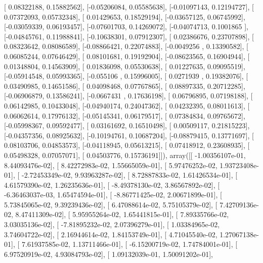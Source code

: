 \documentclass{article}
\begin{document}
       [ 0.08322188,  0.15882562],
       [-0.05206084,  0.05585638],
       [-0.01097143,  0.12194727],
       [ 0.07372093,  0.05732348],
       [ 0.01429653,  0.18529194],
       [-0.03657125,  0.06745992],
       [-0.03059339,  0.06193457],
       [-0.07601703,  0.14269072],
       [-0.04074713,  0.1001865 ],
       [-0.04845761,  0.11988841],
       [-0.10638301,  0.07912307],
       [ 0.02386676,  0.23707898],
       [ 0.08323642,  0.08086589],
       [-0.08866421,  0.22074883],
       [-0.0049256 ,  0.13390582],
       [ 0.06085244,  0.07646429],
       [ 0.08101681,  0.19192904],
       [-0.08623565,  0.16904944],
       [ 0.01348804,  0.14563909],
       [ 0.01836098,  0.05530638],
       [ 0.01227635,  0.09095519],
       [-0.05914548,  0.05993365],
       [-0.055106  ,  0.15996005],
       [ 0.0271939 ,  0.19382076],
       [ 0.03490985,  0.14651586],
       [ 0.04098468,  0.07767865],
       [ 0.08897335,  0.20712285],
       [-0.06906879,  0.13586241],
       [-0.0667431 ,  0.17636198],
       [ 0.06796895,  0.07198188],
       [ 0.06142985,  0.10433048],
       [-0.04940174,  0.24047362],
       [ 0.04232395,  0.08011613],
       [ 0.06062614,  0.17976132],
       [-0.05145341,  0.06179517],
       [ 0.07384834,  0.09765672],
       [-0.05998367,  0.09592477],
       [ 0.03161692,  0.16510498],
       [ 0.00509117,  0.21815223],
       [-0.04357356,  0.08925632],
       [-0.10194761,  0.10687204],
       [-0.08879415,  0.13771697],
       [ 0.08103706,  0.04853573],
       [-0.04118945,  0.05613215],
       [ 0.07418912,  0.23608935],
       [ 0.05498328,  0.07057071],
       [ 0.04503776,  0.15736191]]), array([[ -1.00356107e-01,   8.44093476e-02],
       [  8.42272983e-02,   1.55665059e-01],
       [  5.97476252e-02,   1.93723408e-01],
       [ -2.72453349e-02,   9.93963287e-02],
       [  8.72887833e-02,   1.61426534e-01],
       [  4.61579390e-02,   1.26235636e-01],
       [ -8.49378130e-02,   3.86567892e-02],
       [ -6.36463037e-03,   1.65474594e-01],
       [ -8.86771425e-02,   2.00671899e-01],
       [  5.73845065e-02,   9.39239436e-02],
       [  6.47088614e-02,   5.75105379e-02],
       [  7.42709136e-02,   8.47411309e-02],
       [  5.95955264e-02,   1.65441815e-01],
       [  7.89335766e-02,   3.03035136e-02],
       [ -7.81895232e-02,   2.07396279e-01],
       [  1.03384965e-02,   3.74604722e-02],
       [  2.16944614e-02,   1.84153749e-01],
       [  4.71045540e-02,   1.27067138e-01],
       [  7.61937585e-02,   1.13711466e-01],
       [ -6.15200719e-02,   1.74784001e-01],
       [  6.97520919e-02,   4.93084793e-02],
       [  1.09132039e-01,   1.50091202e-01],
\end{document}
